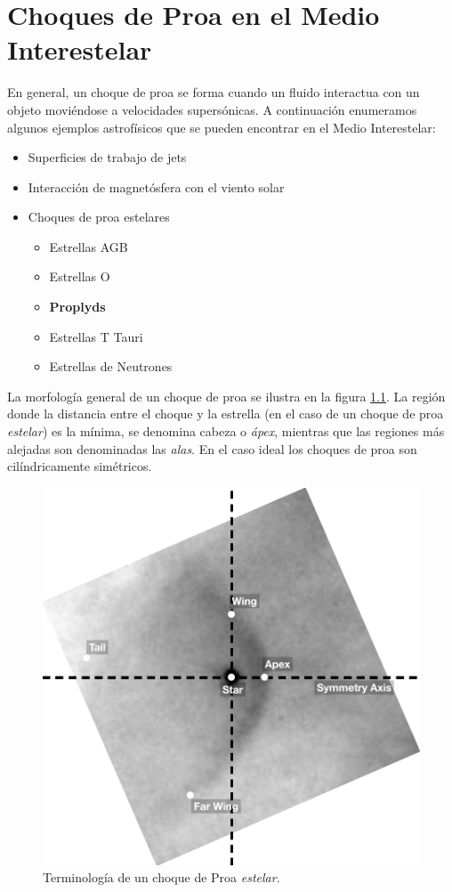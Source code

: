 \chapter[Choques de Proa]{Choques de Proa en el Medio Interestelar}
\label{chap:bow-shocks}
\thispagestyle{empty}

En general, un choque de proa se forma cuando un fluido interactua con un objeto moviéndose a velocidades supersónicas. A continuación enumeramos algunos ejemplos astrofísicos que se pueden encontrar en el Medio Interestelar:

\begin{itemize}
\item Superficies de trabajo de jets
\item Interacción de magnetósfera con el viento solar
\item Choques de proa estelares
  \begin{itemize}
  \item Estrellas AGB
  \item Estrellas O
  \item \textbf{Proplyds}
  \item Estrellas T Tauri
  \item Estrellas de Neutrones
  \end{itemize}
\end{itemize}

La morfología general de un choque de proa se ilustra en la figura \ref{fig:terminology}. La región donde la distancia entre el choque y la estrella (en el caso de un choque de proa \textit{estelar}) es la mínima, se denomina cabeza o \textit{ápex}, mientras que las regiones más alejadas son denominadas las \textit{alas}. En el caso ideal los choques de proa son cilíndricamente simétricos.

\begin{figure}
  \centering
  \includegraphics[width=0.5\linewidth]{./Figures/bow-terminology}
  \caption{Terminología de un choque de Proa \textit{estelar}.}
  \label{fig:terminology}
\end{figure}

